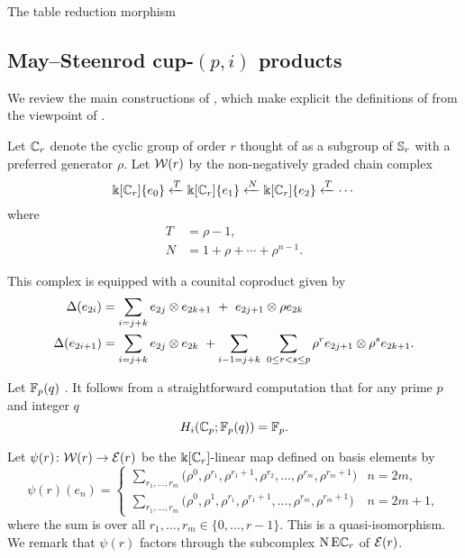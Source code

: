 \sssec

The table reduction morphism \TBW

\subsection{May--Steenrod cup-$(p,i)$ products}

We review the main constructions of \cite{medina2021may_st}, which make explicit the definitions of \cite{steenrod1953cyclic} from the viewpoint of \cite{may1970general}.

\sssec

Let $\mathbb{C}_r$ denote the cyclic group of order $r$ thought of as a subgroup of $\mathbb{S}_r$ with a preferred generator $\rho$.
Let $\mathcal{W}(r)$ by the non-negatively graded chain complex
\begin{equation} \label{eq: minimal resolution}
	\Bbbk[\mathbb{C}_r]\{e_0\} \xleftarrow{T} \Bbbk[\mathbb{C}_r]\{e_1\} \xleftarrow{N} \Bbbk[\mathbb{C}_r]\{e_2\} \xleftarrow{T} \cdots
\end{equation}
where
\begin{equation} \label{eq: T and R definition}
	\begin{split}
		T &= \rho - 1, \\
		N &= 1 + \rho + \cdots + \rho^{n-1}.
	\end{split}
\end{equation}

This complex is equipped with a counital coproduct given by
\begin{align*}
	\Delta(e_{2i}) &=
	\sum_{i=j+k} e_{2j} \otimes e_{2k+1} \ +\ e_{2j+1} \otimes \rho e_{2k} \\
	\Delta(e_{2i+1}) &=
	\sum_{i=j+k} e_{2j} \otimes e_{2k} \ + \sum_{i-1=j+k} \ \sum_{0 \leq r < s \leq p} \rho^r e_{2j+1} \otimes \rho^s e_{2k+1}.
\end{align*}

\sssec

Let ${\mathbb{F}_p}(q)$ \TBW.
It follows from a straightforward computation that for any prime $p$ and integer $q$
\begin{equation*}
	H_i(\mathbb{C}_p; \mathbb{F}_p(q)) = \mathbb{F}_p.
\end{equation*}

\sssec

Let $\psi(r) \colon \mathcal{W}(r) \to \mathcal{E}(r)$ be the $\Bbbk[\mathbb{C}_r]$-linear map defined on basis elements by
\begin{equation*}
	\psi(r)(e_{n}) = \begin{cases}
		\displaystyle{\sum_{r_1, \dots, r_m}} \big(\rho^0, \rho^{r_1}, \rho^{r_1+1}, \rho^{r_2}, \dots, \rho^{r_{m}}, \rho^{r_{m}+1} \big) & n = 2m, \\
		\displaystyle{\sum_{r_1, \dots, r_m}} \big(\rho^0, \rho^1, \rho^{r_1}, \rho^{r_1+1}, \dots, \rho^{r_{m}}, \rho^{r_{m}+1} \big) & n = 2m+1,
	\end{cases}
\end{equation*}
where the sum is over all $r_1, \dots, r_m \in \{0, \dots, r-1\}$.
This is a quasi-isomorphism.
We remark that $\psi(r)$ factors through the subcomplex $\operatorname{N}\mathrm{E}\mathbb{C}_r$ of $\mathcal{E}(r)$.

